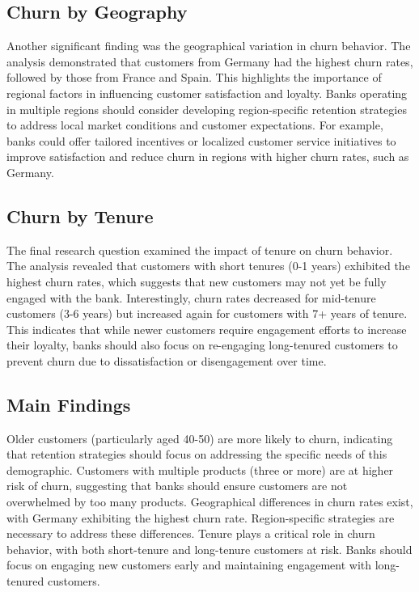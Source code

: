 \documentclass[12pt]{article}
\begin{document}
\subsection{Churn by Geography}
Another significant finding was the geographical variation in churn behavior. The analysis demonstrated that customers from Germany had the highest churn rates, followed by those from France and Spain. This highlights the importance of regional factors in influencing customer satisfaction and loyalty. Banks operating in multiple regions should consider developing region-specific retention strategies to address local market conditions and customer expectations. For example, banks could offer tailored incentives or localized customer service initiatives to improve satisfaction and reduce churn in regions with higher churn rates, such as Germany.

\subsection{Churn by Tenure}
The final research question examined the impact of tenure on churn behavior. The analysis revealed that customers with short tenures (0-1 years) exhibited the highest churn rates, which suggests that new customers may not yet be fully engaged with the bank. Interestingly, churn rates decreased for mid-tenure customers (3-6 years) but increased again for customers with 7+ years of tenure. This indicates that while newer customers require engagement efforts to increase their loyalty, banks should also focus on re-engaging long-tenured customers to prevent churn due to dissatisfaction or disengagement over time.

\subsection{Main Findings}
\textbf{}Older customers (particularly aged 40-50) are more likely to churn, indicating that retention strategies should focus on addressing the specific needs of this demographic.  
\textbf{}Customers with multiple products (three or more) are at higher risk of churn, suggesting that banks should ensure customers are not overwhelmed by too many products.  
\textbf{}Geographical differences in churn rates exist, with Germany exhibiting the highest churn rate. Region-specific strategies are necessary to address these differences.  
\textbf{}Tenure plays a critical role in churn behavior, with both short-tenure and long-tenure customers at risk. Banks should focus on engaging new customers early and maintaining engagement with long-tenured customers.  
\end{document}
